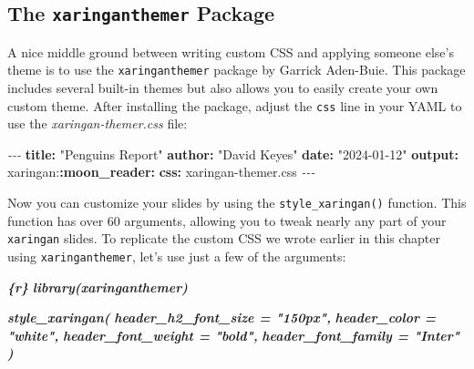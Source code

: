 \documentclass[
]{book}
\newenvironment{Shaded}{\begin{snugshade}}{\end{snugshade}}
\newcommand{\AttributeTok}[1]{\textcolor[rgb]{0.13,0.29,0.53}{#1}}
\newcommand{\FunctionTok}[1]{\textcolor[rgb]{0.13,0.29,0.53}{\textbf{#1}}}
\newcommand{\InformationTok}[1]{\textcolor[rgb]{0.56,0.35,0.01}{\textbf{\textit{#1}}}}
\newcommand{\KeywordTok}[1]{\textcolor[rgb]{0.13,0.29,0.53}{\textbf{#1}}}
\newcommand{\PreprocessorTok}[1]{\textcolor[rgb]{0.56,0.35,0.01}{\textit{#1}}}
\newcommand{\StringTok}[1]{\textcolor[rgb]{0.31,0.60,0.02}{#1}}
\begin{document}
\hypertarget{the-xaringanthemer-package}{%
\subsection*{\texorpdfstring{The \texttt{xaringanthemer} Package}{The xaringanthemer Package}}\label{the-xaringanthemer-package}}

A nice middle ground between writing custom CSS and applying someone else's theme is to use the \texttt{xaringanthemer} package by Garrick Aden-Buie. This package includes several built-in themes but also allows you to easily create your own custom theme. After installing the package, adjust the \texttt{css} line in your YAML to use the \emph{xaringan-themer.css} file:

\begin{Shaded}
\begin{Highlighting}[]
\PreprocessorTok{{-}{-}{-}}
\FunctionTok{title}\KeywordTok{:}\AttributeTok{ }\StringTok{"Penguins Report"}
\FunctionTok{author}\KeywordTok{:}\AttributeTok{ }\StringTok{"David Keyes"}
\FunctionTok{date}\KeywordTok{:}\AttributeTok{ }\StringTok{"2024{-}01{-}12"}
\FunctionTok{output}\KeywordTok{:}
\AttributeTok{  xaringan:}\FunctionTok{:moon\_reader}\KeywordTok{:}
\AttributeTok{    }\FunctionTok{css}\KeywordTok{:}\AttributeTok{ xaringan{-}themer.css}
\PreprocessorTok{{-}{-}{-}}
\end{Highlighting}
\end{Shaded}

Now you can customize your slides by using the \texttt{style\_xaringan()} function. This function has over 60 arguments, allowing you to tweak nearly any part of your \texttt{xaringan} slides. To replicate the custom CSS we wrote earlier in this chapter using \texttt{xaringanthemer}, let's use just a few of the arguments:

\begin{Shaded}
\begin{Highlighting}[]
\InformationTok{\textasciigrave{}\textasciigrave{}\textasciigrave{}\{r\}}
\InformationTok{library(xaringanthemer)}

\InformationTok{style\_xaringan(}
\InformationTok{  header\_h2\_font\_size = "150px",}
\InformationTok{  header\_color = "white",}
\InformationTok{  header\_font\_weight = "bold",}
\InformationTok{  header\_font\_family = "Inter"}
\InformationTok{)}
\InformationTok{\textasciigrave{}\textasciigrave{}\textasciigrave{}}
\end{Highlighting}
\end{Shaded}
\end{document}
